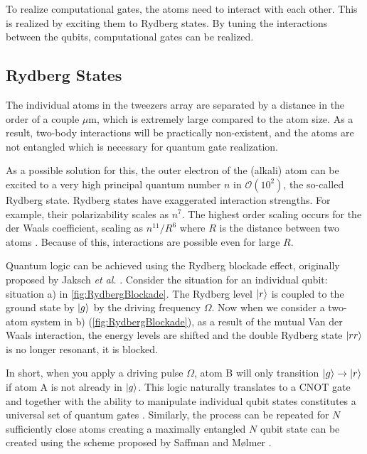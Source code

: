 To realize computational gates, the atoms need to interact with each other. This is realized by exciting them to Rydberg states. By tuning the interactions between the qubits, computational gates can be realized.


\subsection{Rydberg States}

The individual atoms in the tweezers array are separated by a distance in the order of a couple $\mu$m, which is extremely large compared to the atom size. As a result, two-body interactions will be practically non-existent, and the atoms are not entangled which is necessary for quantum gate realization.

As a possible solution for this, the outer electron of the (alkali) atom can be excited to a very high principal quantum number $n$ in $\mathcal{O}(10^2)$, the so-called Rydberg state. Rydberg states have exaggerated interaction strengths. For example, their polarizability scales as $n^7$. The highest order scaling occurs for the der Waals coefficient, scaling as $n^{11}/R^6$ where $R$ is the distance between two atoms \cite{Gallagher1994}. Because of this, interactions are possible even for large $R$.

Quantum logic can be achieved using the Rydberg blockade effect, originally proposed by Jaksch \textit{et al.} \cite{Jaksch2000}. Consider the situation for an individual qubit: situation a) in \cref{fig:RydbergBlockade}. The Rydberg level $\lvert r\rangle$ is coupled to the ground state by $\lvert g\rangle$ by the driving frequency $\Omega$. Now when we consider a two-atom system in b) (\cref{fig:RydbergBlockade}), as a result of the mutual Van der Waals interaction, the energy levels are shifted and the double Rydberg state $\lvert rr\rangle$ is no longer resonant, it is blocked.

In short, when you apply a driving pulse $\Omega$, atom B will only transition $\lvert g\rangle \rightarrow \lvert r\rangle$ if atom A is not already in $\lvert g\rangle$. This logic naturally translates to a CNOT gate and together with the ability to manipulate individual qubit states constitutes a universal set of quantum gates \cite{Nielsen2011}. Similarly, the process can be repeated for $N$ sufficiently close atoms creating a maximally entangled $N$ qubit state can be created using the scheme proposed by Saffman and Mølmer \cite{Saffman2009}.

